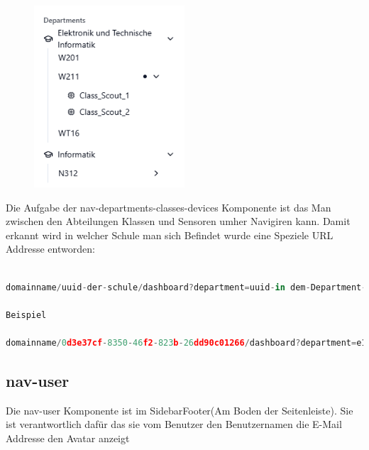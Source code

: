 \begin{inhalt}
\begin{enumerate}[label=\textbf{\arabic*.}]
\begin{figure}[!htb]
\centering
\includegraphics[width=0.5\textwidth]{files/Thomas/pics/Website/Sidebar/nav-departments-classes-devices/nav-screen.png}
\caption[Bildbezeichnung für Abbildungsverzeichnis]{}
\label{fig:gehaeuse_internet_bild}
\end{figure}



Die Aufgabe der nav-departments-classes-devices Komponente ist das Man zwischen den Abteilungen Klassen und Sensoren umher Navigiren kann. Damit erkannt wird in welcher Schule man sich Befindet wurde eine Speziele URL Addresse entworden:

\begin{lstlisting}[language=TypeScript]

domainname/uuid-der-schule/dashboard?department=uuid-in dem-Department-man-gerae-ist&class=uuid-in-welcher-Klasse-man-sich-gerade befindet&device=device-uuid

Beispiel

domainname/0d3e37cf-8350-46f2-823b-26dd90c01266/dashboard?department=e1ed2bd8-4c9c-40f8-bec7-4edcebe59fc1&class=eb4355fd-1e98-4961-be62-36fa9fc5cec0&device=a52eb8dc-5df5-475a-8a9f-f5f5a24ac2d3
\end{lstlisting}



\subsection{nav-user}

Die nav-user Komponente ist im SidebarFooter(Am Boden der Seitenleiste). Sie ist verantwortlich dafür das sie vom Benutzer den Benutzernamen die E-Mail Addresse den Avatar anzeigt


\end{enumerate}
\end{inhalt}
